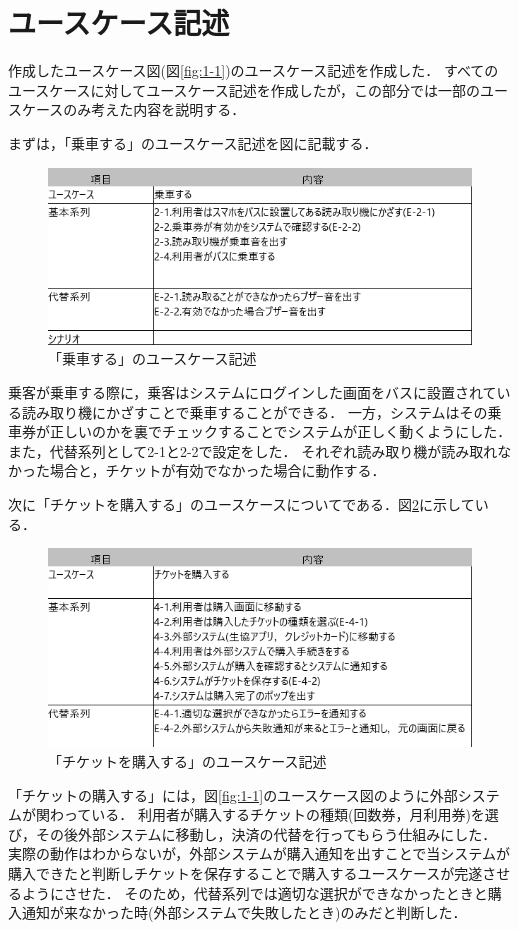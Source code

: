 \documentclass[documentclass]{jsarticle}
\begin{document}
\newpage

\section{ユースケース記述}
作成したユースケース図(図\ref*{fig:1-1})のユースケース記述を作成した．
すべてのユースケースに対してユースケース記述を作成したが，この部分では一部のユースケースのみ考えた内容を説明する．

まずは，「乗車する」のユースケース記述を図に記載する．
\begin{figure}[H]
  \begin{center}
    \includegraphics*[scale=0.8]{figure/3-2.png}
  \end{center}
  \caption{「乗車する」のユースケース記述}
  \label{fig:3-2}
\end{figure}
乗客が乗車する際に，乗客はシステムにログインした画面をバスに設置されている読み取り機にかざすことで乗車することができる．
一方，システムはその乗車券が正しいのかを裏でチェックすることでシステムが正しく動くようにした．
また，代替系列として2-1と2-2で設定をした．
それぞれ読み取り機が読み取れなかった場合と，チケットが有効でなかった場合に動作する．

次に「チケットを購入する」のユースケースについてである．図\ref*{fig:3-4}に示している．
\begin{figure}[H]
  \begin{center}
    \includegraphics*[scale=0.8]{figure/3-4.png}
  \end{center}
  \caption{「チケットを購入する」のユースケース記述}
  \label{fig:3-4}
\end{figure}
「チケットの購入する」には，図\ref*{fig:1-1}のユースケース図のように外部システムが関わっている．
利用者が購入するチケットの種類(回数券，月利用券)を選び，その後外部システムに移動し，決済の代替を行ってもらう仕組みにした．
実際の動作はわからないが，外部システムが購入通知を出すことで当システムが購入できたと判断しチケットを保存することで購入するユースケースが完遂させるようにさせた．
そのため，代替系列では適切な選択ができなかったときと購入通知が来なかった時(外部システムで失敗したとき)のみだと判断した．
\end{document}
